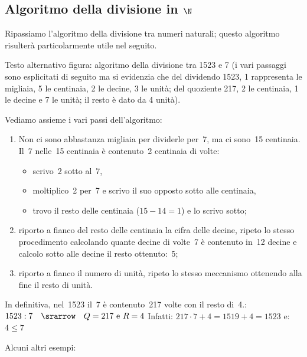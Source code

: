 
\subsection{Algoritmo della divisione in \texorpdfstring{$\N$}{N}}

Ripassiamo l'algoritmo della divisione tra numeri naturali; 
questo algoritmo risulterà particolarmente utile nel seguito.

\vspace{-1.5em}
\immagine
{Testo alternativo figura: algoritmo della divisione tra 1523 e 7 
(i vari passaggi sono esplicitati di seguito ma si evidenzia che del 
dividendo 1523, 1 rappresenta le migliaia, 5 le centinaia, 2 le decine, 
3 le unità; 
del quoziente 217, 2 le centinaia, 1 le decine e 7 le unità; 
il resto è dato da 4 unità).}
{\divisinta}
\vspace{-2.5em}

Vediamo assieme i vari passi dell'algoritmo:
\begin{enumerate} [nosep]
\item Non ci sono abbastanza migliaia per dividerle per~7, ma ci sono~15 
centinaia. 
Il~7 nelle~15 centinaia è contenuto~2 centinaia di volte:
  \begin{itemize} [nosep]
  \item scrivo~2 sotto al~7,
  \item moltiplico~2 per~7 e scrivo il suo opposto sotto alle centinaia,
  \item trovo il resto delle centinaia (\(15-14=1\)) e lo scrivo sotto;
  \end{itemize}
\item riporto a fianco del resto delle centinaia la cifra delle decine, 
ripeto lo stesso procedimento calcolando quante decine di volte~7 è 
contenuto in~12 decine e calcolo sotto alle decine il resto ottenuto:~5;
\item riporto a fianco il numero di unità, ripeto lo stesso meccanismo 
ottenendo alla fine il resto di unità.
\end{enumerate}
In definitiva, nel~1523 il~7 è contenuto~217 volte con il resto di~4.:\\
\(1523:7 \quad \srarrow \quad Q=217 \text{ e } R=4\) \quad
Infatti: \(217 \cdot 7 + 4 = 1519 + 4 = 1523\)
e: \(4 \leqslant 7\)

\pagebreak %
Alcuni altri esempi:

